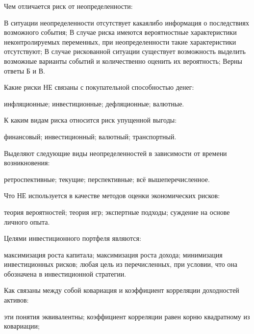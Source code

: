 \documentclass[12pt, table, twoside, a4paper]{exam}
\begin{document}
\begin{questions}
	\begin{multicols}{2}
		\setlength{\columnsep}{1cm}
		
		\question Чем отличается риск от неопределенности:
		\begin{choices}
			\CC В ситуации неопределенности отсутствует какаялибо информация о последствиях возможного события;
			\choice В случае риска имеются вероятностные характеристики неконтролируемых переменных, при неопределенности такие характеристики отсутствуют;
			\choice В случае рискованной ситуации существует возможность выделить возможные варианты событий и количественно оценить их вероятность;
			\choice Верны ответы Б и В.
		\end{choices}
		\question Какие риски НЕ связаны с покупательной способностью денег:
		\begin{choices}
			\choice инфляционные;
			\choice инвестиционные;
			\CC дефляционные;
			\choice валютные.
		\end{choices}
		\question К каким видам риска относится риск упущенной выгоды:
		\begin{choices}
			\choice финансовый;
			\choice инвестиционный;
			\choice валютный;
			\CC транспортный.
		\end{choices}
		\question Выделяют следующие виды неопределенностей в зависимости от времени возникновения:
		\begin{choices}
			\choice ретроспективные;
			\CC текущие;
			\choice перспективные;
			\choice всё вышеперечисленное.
		\end{choices}
		\question Что НЕ используется в качестве методов оценки экономических рисков:
		\begin{choices}
			\CC теория вероятностей;
			\choice теория игр;
			\choice экспертные подходы;
			\choice суждение на основе личного опыта.
		\end{choices}
		\question Целями инвестиционного портфеля являются:
		\begin{choices}
			\choice максимизация роста капитала;
			\CC максимизация роста дохода;
			\choice минимизация инвестиционных рисков;
			\choice любая цель из перечисленных, при условии, что она обозначена в инвестиционной стратегии.
		\end{choices}
		\question Как связаны между собой ковариация и коэффициент корреляции доходностей активов:
		\begin{choices}
			\choice эти понятия эквивалентны;
			\CC коэффициент корреляции равен корню квадратному из ковариации;

\end{choices}
\end{multicols}
\end{questions}
\end{document}
